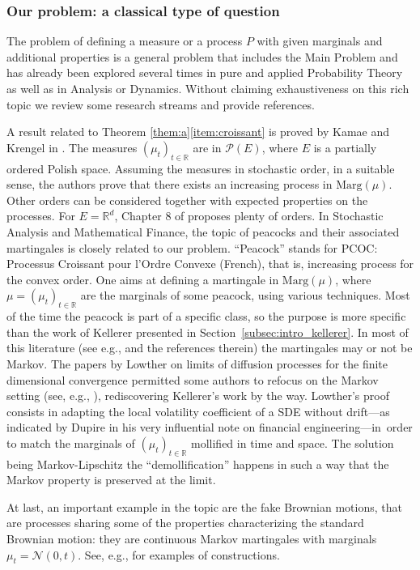 \documentclass[11pt]{article}
\theoremstyle{plain}
\theoremstyle{definition}
\newcommand{\p}{\mathcal{P}}
\newcommand{\ma}{\mathrm{Marg}}
\newcommand{\R}{\mathbb{R}}
\begin{document}
\subsubsection*{Our problem: a classical type of question} The problem of defining a measure or a process $P$ with given marginals and additional properties is a general problem that includes the Main Problem and has already been explored several times in pure and applied Probability Theory as well as in Analysis or Dynamics. Without claiming exhaustiveness on this rich topic we review some research streams and provide references.

A result related to Theorem \ref{them:a}\eqref{item:croissant} is proved by Kamae and Krengel in \cite{KaKr}. The measures $(\mu_t)_{t\in \R}$ are in $\p(E)$, where $E$ is a partially ordered Polish space. Assuming the measures in stochastic order, in a suitable sense, the authors prove that there exists an increasing process in $\ma(\mu)$. Other orders can be considered together with expected properties on the processes. For $E=\R^d$, Chapter 8 of \cite{SS} proposes plenty of orders. In Stochastic Analysis and Mathematical Finance, the topic of peacocks and their associated martingales is closely related to our problem. ``Peacock'' stands for PCOC: Processus Croissant pour l'Ordre Convexe (French), that is, increasing process for the convex order. One aims at defining a martingale in $\ma(\mu)$, where $\mu=(\mu_t)_{t\in \R}$ are the marginals of some peacock, using various techniques. Most of the time the peacock is part of a specific class, so the purpose is more specific than the work of Kellerer presented in Section~\ref{subsec:intro_kellerer}. In most of this literature (see e.g., \cite{Gy,Dupire,BrSh,MaYo02,Ju_ejp,HTT,HiRo13,Hob16,pages} and the references therein) the martingales may or not be Markov. The papers by Lowther \cite{Low,Low2} on limits of diffusion processes for the finite dimensional convergence permitted some authors to refocus on the Markov setting (see, e.g., \cite{BHS,HiRoYo14,Ju_seminaire}), rediscovering Kellerer's work by the way. Lowther's proof consists in adapting the local volatility coefficient of a SDE without drift---as indicated by Dupire in his very influential note \cite{Dupire} on financial engineering---in~order to match the marginals of $(\mu_t)_{t\in \R}$ mollified in time and space. The solution being Markov-Lipschitz the ``demollification'' happens in such a way that the Markov property is preserved at the limit.

At last, an important example in the topic are the fake Brownian motions, that are processes sharing some of the properties characterizing the standard Brownian motion: they are continuous Markov martingales with marginals $\mu_t=\mathcal{N}(0,t)$. See, e.g., \cite{MaYo02,HaKl,Albin,Ol,Hob_fake,HTT} for examples of constructions.
\end{document}
